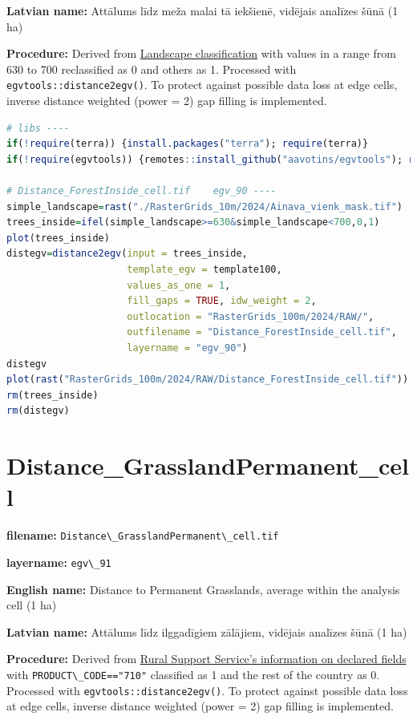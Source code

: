 \documentclass[
]{book}
\newcommand{\passthrough}[1]{#1}
\begin{document}
\textbf{Latvian name:} Attālums līdz meža malai tā iekšienē, vidējais analīzes šūnā (1 ha)

\textbf{Procedure:} Derived from \hyperref[Ch05.03]{Landscape classification} with values in
a range from 630 to 700 reclassified as 0 and others as 1. Processed
with \passthrough{\lstinline!egvtools::distance2egv()!}. To protect against possible data loss at
edge cells, inverse distance
weighted (power = 2) gap filling is implemented.

\begin{lstlisting}[language=R]
# libs ----
if(!require(terra)) {install.packages("terra"); require(terra)}
if(!require(egvtools)) {remotes::install_github("aavotins/egvtools"); require(egvtools)}

# Distance_ForestInside_cell.tif    egv_90 ----
simple_landscape=rast("./RasterGrids_10m/2024/Ainava_vienk_mask.tif")
trees_inside=ifel(simple_landscape>=630&simple_landscape<700,0,1)
plot(trees_inside)
distegv=distance2egv(input = trees_inside,
                     template_egv = template100,
                     values_as_one = 1,
                     fill_gaps = TRUE, idw_weight = 2,
                     outlocation = "RasterGrids_100m/2024/RAW/",
                     outfilename = "Distance_ForestInside_cell.tif",
                     layername = "egv_90")
distegv
plot(rast("RasterGrids_100m/2024/RAW/Distance_ForestInside_cell.tif"))
rm(trees_inside)
rm(distegv)
\end{lstlisting}

\section{Distance\_GrasslandPermanent\_cell}\label{ch06.091}

\textbf{filename:} \passthrough{\lstinline!Distance\_GrasslandPermanent\_cell.tif!}

\textbf{layername:} \passthrough{\lstinline!egv\_91!}

\textbf{English name:} Distance to Permanent Grasslands, average within the analysis cell (1 ha)

\textbf{Latvian name:} Attālums līdz ilggadīgiem zālājiem, vidējais analīzes šūnā (1 ha)

\textbf{Procedure:} Derived from \hyperref[Ch04.02]{Rural Support Service's information on declared fields}
with \passthrough{\lstinline!PRODUCT\_CODE=="710"!} classified as 1 and the rest of the country as 0. Processed
with \passthrough{\lstinline!egvtools::distance2egv()!}. To protect against possible data loss at
edge cells, inverse distance weighted (power = 2) gap filling is implemented.
\end{document}

